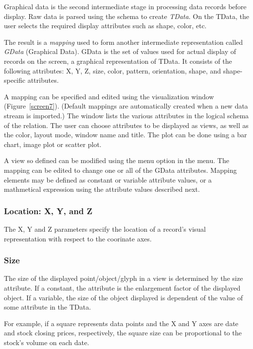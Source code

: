 Graphical data is the second intermediate stage in processing data records
before display. Raw data is parsed using the schema to create {\em TData}. On
the TData, the user selects the required display attributes such as shape,
color, etc.

The result is a {\em mapping} used to form another intermediate representation
called {\em GData} (Graphical Data). GData is the set of values used for actual
display of records on the screen, a graphical representation of TData. It
consists of the following attributes: X, Y, Z, size, color, pattern,
orientation, shape, and shape-specific attributes.

A mapping can be specified and edited using the visualization window
(Figure~\ref{screen7}). (Default mappings are automatically created when a new
data stream is imported.) The window lists the various attributes in the logical
schema of the relation. The user can choose attributes to be displayed as views,
as well as the color, layout mode, window name and title. The plot can be done
using a bar chart, image plot or scatter plot.


A view so defined can be modified using the  menu option in the
 menu. The mapping can be edited to change one or all of the
GData attributes. Mapping elements may be defined as constant or variable
attribute values, or a mathmetical expression using the attribute values
described next.

\subsubsection{Location: X, Y, and Z}

The X, Y and Z parameters specify the location of a record's visual
representation with respect to the coorinate axes.

\subsubsection{Size}

The size of the displayed point/object/glyph in a view is determined by the size
attribute. If a constant, the attribute is the enlargement factor of the
displayed object. If a variable, the size of the object displayed is dependent
of the value of some attribute in the TData.

For example, if a square represents data points and the X and Y axes are date
and stock closing prices, respectively, the square size can be proportional to
the stock's volume on each date.

